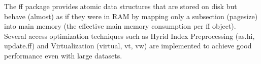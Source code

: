     The ff package provides atomic data structures that are stored on disk
    but behave (almost) as if they were in RAM by mapping only a subsection
    (pagesize) into main memory (the effective main memory consumption per
    ff object). Several access optimization techniques such as Hyrid Index
    Preprocessing (as.hi, update.ff) and Virtualization (virtual, vt, vw)
    are implemented to achieve good performance even with large datasets.
